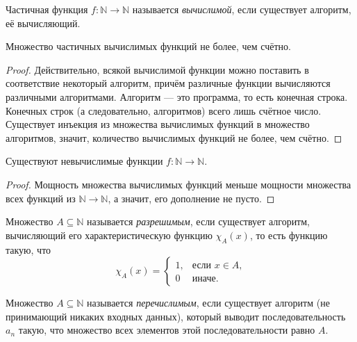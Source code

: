 \documentclass{article}
\begin{document}
    \begin{definition}
        Частичная функция $f: \mathbb{N} \to \mathbb{N}$ называется \textit{вычислимой}, если существует
        алгоритм, её вычисляющий.
    \end{definition}

    \begin{statement}
        Множество частичных вычислимых функций не более, чем счётно.
    \end{statement}
    \begin{proof}
        Действительно, всякой вычислимой функции можно поставить в соответствие некоторый алгоритм,
        причём различные функции вычисляются различными алгоритмами. Алгоритм --- это программа,
        то есть конечная строка. Конечных строк (а следовательно, алгоритмов) всего лишь счётное число.
        Существует инъекция из множества вычислимых функций в множество алгоритмов, значит, количество
        вычислимых функций не более, чем счётно.
    \end{proof}

    \begin{theorem}
        Существуют невычислимые функции $f: \mathbb{N} \to \mathbb{N}$.
    \end{theorem}
    \begin{proof}
        Мощность множества вычислимых функций меньше мощности множества всех функций из $\mathbb{N}
        \to \mathbb{N}$, а значит, его дополнение не пусто.
    \end{proof}

    \begin{definition}
        Множество $A \subseteq \mathbb{N}$ называется \textit{разрешимым}, если существует алгоритм, вычисляющий
        его характеристическую функцию $\chi_A(x)$, то есть функцию такую, что
        $$
            \chi_A(x) =
            \begin{cases}
                1, & \text{если $x \in A$,}\\
                0 & \text{иначе.}
            \end{cases}
        $$
    \end{definition}

    \begin{definition}
        Множество $A \subseteq \mathbb{N}$ называется \textit{перечислимым}, если существует
        алгоритм (не принимающий никаких входных данных), который выводит последовательность $a_n$
        такую, что множество всех элементов этой последовательности равно $A$.
    \end{definition}
\end{document}

